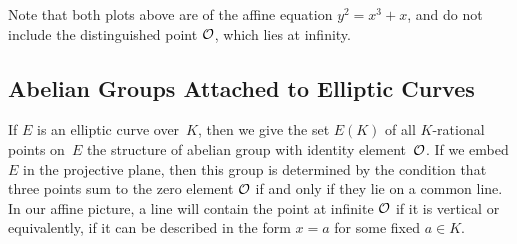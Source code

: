 Note that both plots above are of the affine equation $y^2 = x^3 + x$,
and do not include the distinguished point $\mathcal{O}$, which lies at
infinity.


\subsection{Abelian Groups Attached to Elliptic Curves}
If $E$ is an elliptic curve over~$K$, then we give the set
$E(K)$ of all $K$-rational points on~$E$ the structure of abelian
group with identity element~$\mathcal{O}$.  If we embed $E$ in the projective
plane, then this group is determined by the condition that three
points sum to the zero element $\mathcal{O}$ if and only if they lie on a
common line.
In our affine picture, a line will contain the point at infinite $\mathcal{O}$
if it is vertical or equivalently, if it can be described in the
form $x=a$ for some fixed $a\in K$.


